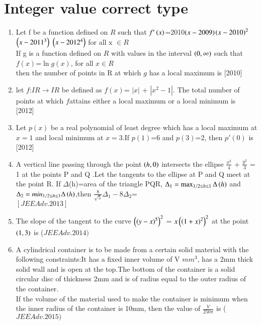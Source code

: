 \documentclass[journal,12pt,twocolumn]{IEEEtran}
\theoremstyle{remark}
\begin{document}
																				 \section{Integer value correct type}
																				 \begin{enumerate}
																				 \item Let f be a function defined on $R$  such that $f'\left(x\right)$=2010$\left(x-2009\right)$$\left(x-2010\right)^2$$\left(x-2011^3\right)$ $\left(x-2012^4\right)$ for all x $\in R$ \\ If g is a function defined on $R$ with values in the interval $\left(0,\infty\right)$ such that \\
																				   $f(x)$=$\ln{g(x)}$, for all $x\in R$\\ then the number of points in R at which $g$ has a local maximum is \hfill [2010]\\
																				   \item let $f$:$IR \rightarrow IR$ be defined as $f(x)$= $|x|$ + $|x^2-1|$. The total number of points at which $f$attains either a local maximum or a local minimum is\\ \hfill [2012] \\
																				   \item Let $p(x)$ be a real polynomial of least degree which has a local maximum at $x=1$ and local minimum at $x=3$.If $p(1)$=6 and $p(3)$=2, then $p'(0)$ is \hfill [2012] \\
																				   \item A vertical line passing through the point $\left(h,0\right)$ intersects the ellipse $\frac{x^2}{4}$ + $\frac{y^2}{3}$ = 1 at the points P and Q .Let the tangents to the ellipse at P and Q meet at the point R. If $\Delta$(h)=area of the triangle PQR, $\Delta_1  = \max _{1/2\leq h \leq 1}\Delta\left(h\right)$ and $\Delta_2 = min_{1/2\leq h \leq 1}\Delta\left(h\right)$,then $\frac{8}{\sqrt{5}}\Delta_1 - 8\Delta_2$=\\\hfill $[JEEAdv.2013]$\\
																				   \item The slope of the tangent to the curve $\left(\left(y-x\right)^5\right)^2$ = $x\left(\left(1+x\right)^2\right)^2$ at the point $\left(1,3\right)$ is \hfill ($JEE Adv. 2014)$ \\
																				   \item A cylindrical container is to be made from a certain solid material with the following constraints:It has a fixed inner volume of V $mm^3$, has a 2mm thick solid wall and is open at the top.The bottom of the container is a solid circular disc of thickness 2mm and is of radius equal to the outer radius of the container.\\If the volume of the material used to make the container is minimum when the inner radius of the container is 10mm, then the value of $\frac{V}{250\pi}$ is \hfill ($JEE Adv. 2015)$ \\  
																				   \end{enumerate}
																				   
\end{document}
